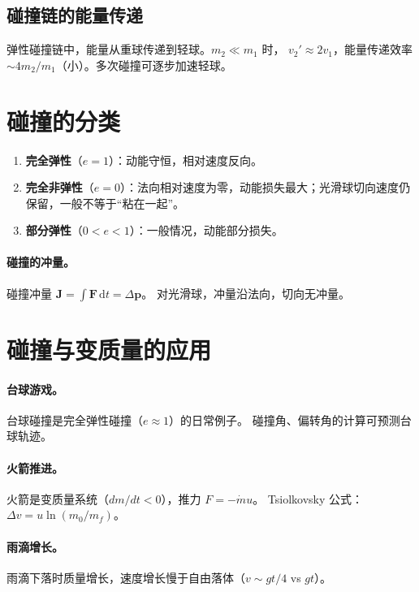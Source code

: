 \documentclass[UTF8,a4paper,11pt]{ctexart}
\begin{document}
\subsection{碰撞链的能量传递}
\label{sub:energy-transfer}

弹性碰撞链中，能量从重球传递到轻球。$m_2\ll m_1$ 时，
$v_2'\approx 2v_1$，能量传递效率 $\sim 4m_2/m_1$（小）。多次碰撞可逐步加速轻球。

\section{碰撞的分类}
\label{sec:collision-types}

\begin{enumerate}
  \item \textbf{完全弹性}（$e=1$）：动能守恒，相对速度反向。
  \item \textbf{完全非弹性}（$e=0$）：法向相对速度为零，动能损失最大；光滑球切向速度仍保留，一般不等于“粘在一起”。
  \item \textbf{部分弹性}（$0<e<1$）：一般情况，动能部分损失。
\end{enumerate}

\paragraph{碰撞的冲量。}
碰撞冲量 $\boldsymbol J=\int \boldsymbol F\,\mathrm dt=\Delta\boldsymbol p$。
对光滑球，冲量沿法向，切向无冲量。

\section{碰撞与变质量的应用}
\label{sec:applications}

\paragraph{台球游戏。}
台球碰撞是完全弹性碰撞（$e\approx1$）的日常例子。
碰撞角、偏转角的计算可预测台球轨迹。

\paragraph{火箭推进。}
火箭是变质量系统（$dm/dt<0$），推力 $F=-\dot m u$。
Tsiolkovsky 公式：$\Delta v=u\ln(m_0/m_f)$。

\paragraph{雨滴增长。}
雨滴下落时质量增长，速度增长慢于自由落体（$v\sim gt/4$ vs $gt$）。
\end{document}

